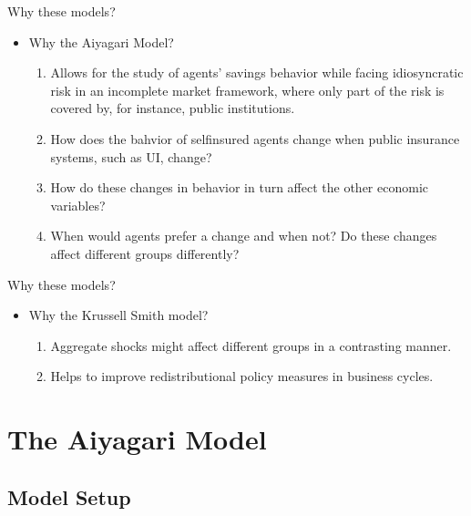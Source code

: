 \documentclass{beamer}
\begin{document}
\begin{frame}{Why these models?}
	\begin{itemize}
	
	\item {
	Why the Aiyagari Model? 
	}
	\begin{enumerate}
	\item {
Allows for the study of agents' savings behavior while facing idiosyncratic risk in an incomplete market framework, where only part of the risk is covered by, for instance, public institutions. 
	}
	\item {
How does the bahvior of selfinsured agents change when public insurance systems, such as UI, change? 
	}
	\item {
	How do these changes in behavior in turn affect the other economic variables?
	}
	\item {	
	When would agents prefer a change and when not? Do these changes affect different groups differently? 
	}	
	\end{enumerate}

	\end{itemize}

\end{frame}

\begin{frame}{Why these models?}
	\begin{itemize}
	
	\item {
	Why the Krussell Smith model? 
	}
	
	\begin{enumerate}
	
	\item {
Aggregate shocks might affect different groups in a contrasting manner.  
	}
	\item {
Helps to improve redistributional policy measures in business cycles.
	}

	\end{enumerate}

	\end{itemize}

\end{frame}


\section{The Aiyagari Model}
\subsection{Model Setup}
\end{document}
